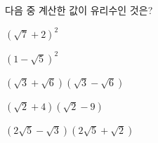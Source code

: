 다음 중 계산한 값이 유리수인 것은?
\begin{choicesii}{\rule[-3ex]{0pt}{8ex}$(\sqrt{7}+2)^2$}{\rule[-3ex]{0pt}{8ex}$(1-\sqrt{5})^2$}{\rule[-3ex]{0pt}{8ex}$(\sqrt{3}+\sqrt{6})(\sqrt{3}-\sqrt{6})$}{\rule[-3ex]{0pt}{8ex}$(\sqrt{2}+4)(\sqrt{2}-9)$}{\rule[-3ex]{0pt}{8ex}$(2\sqrt{5}-\sqrt{3})(2\sqrt{5}+\sqrt{2})$}\end{choicesii}
